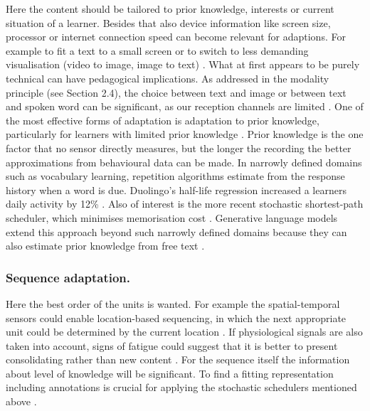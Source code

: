 \documentclass[runningheads]{llncs}
\begin{document}
Here the content should be tailored to prior knowledge, interests or current situation of a learner.
Besides that also device information like screen size, processor or internet connection speed can become relevant for adaptions. For example to fit a text to a small screen or to switch to less demanding visualisation (video to image, image to text) \cite{gumbheer_personalized_2022}.
What at first appears to be purely technical can have pedagogical implications. As addressed in the modality principle (see Section 2.4), the choice between text and image or between text and spoken word can be significant, as our reception channels are limited \cite{mayer_past_2024}.
One of the most effective forms of adaptation is adaptation to prior knowledge, particularly for learners with limited prior knowledge \cite{mayer_past_2024}.
Prior knowledge is the one factor that no sensor directly measures, but the longer the recording the better approximations from behavioural data can be made.
In narrowly defined domains such as vocabulary learning, repetition algorithms estimate from the response history when a word is due. Duolingo’s half-life regression increased a learners daily activity by 12\% \cite{settles_trainable_2016}. Also of interest is the more recent stochastic shortest-path scheduler, which minimises memorisation cost \cite{ye_stochastic_2022}. Generative language models extend this approach beyond such narrowly defined domains because they can also estimate prior knowledge from free text \cite{hatchett_learning_2026}.



\subsubsection{Sequence adaptation.}
Here the best order of the units is wanted. For example the spatial-temporal sensors could enable location-based sequencing, in which the next appropriate unit could be determined by the current location \cite{lee_systematic_2022}. %
If physiological signals are also taken into account, signs of fatigue could suggest that it is better to present consolidating rather than new content \cite{youssef_when_2025}.
For the sequence itself the information about level of knowledge will be significant. To find a fitting representation including annotations is crucial for applying the stochastic schedulers mentioned above \cite{ye_stochastic_2022}.
\end{document}
